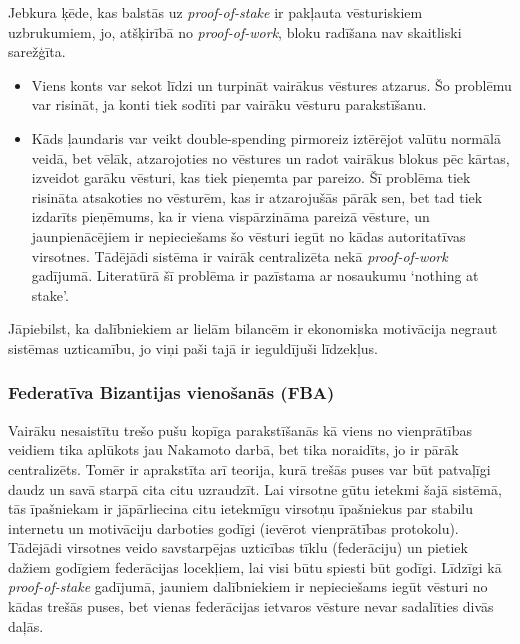 Jebkura ķēde, kas balstās uz \textit{proof-of-stake} ir pakļauta vēsturiskiem uzbrukumiem, jo, atšķirībā no \textit{proof-of-work}, bloku radīšana nav skaitliski sarežģīta.
\begin{itemize}
    \item Viens konts var sekot līdzi un turpināt vairākus vēstures atzarus. Šo problēmu var risināt, ja konti tiek sodīti par vairāku vēsturu parakstīšanu.
    \item Kāds ļaundaris var veikt double-spending pirmoreiz iztērējot valūtu normālā veidā, bet vēlāk, atzarojoties no vēstures un radot vairākus blokus pēc kārtas, izveidot garāku vēsturi, kas tiek pieņemta par pareizo. Šī problēma tiek risināta atsakoties no vēsturēm, kas ir atzarojušās pārāk sen, bet tad tiek izdarīts pieņēmums, ka ir viena vispārzināma pareizā vēsture, un jaunpienācējiem ir nepieciešams šo vēsturi iegūt no kādas autoritatīvas virsotnes. Tādējādi sistēma ir vairāk centralizēta nekā \textit{proof-of-work} gadījumā.\cite{poelstra15} Literatūrā šī problēma ir pazīstama ar nosaukumu `nothing at stake'.
\end{itemize}
Jāpiebilst, ka dalībniekiem ar lielām bilancēm ir ekonomiska motivācija negraut sistēmas uzticamību, jo viņi paši tajā ir ieguldījuši līdzekļus.

\subsubsection{Federatīva Bizantijas vienošanās (FBA)}
Vairāku nesaistītu trešo pušu kopīga parakstīšanās kā viens no vienprātības veidiem tika aplūkots jau Nakamoto darbā\cite{nakamoto08}, bet tika noraidīts, jo ir pārāk centralizēts. Tomēr ir aprakstīta arī teorija, kurā trešās puses var būt patvaļīgi daudz un savā starpā cita citu uzraudzīt.\cite{mazieres15}
Lai virsotne gūtu ietekmi šajā sistēmā, tās īpašniekam ir jāpārliecina citu ietekmīgu virsotņu īpašniekus par stabilu internetu un motivāciju darboties godīgi (ievērot vienprātības protokolu). Tādējādi virsotnes veido savstarpējas uzticības tīklu (federāciju) un pietiek dažiem godīgiem federācijas locekļiem, lai visi būtu spiesti būt godīgi. Līdzīgi kā \textit{proof-of-stake} gadījumā, jauniem dalībniekiem ir nepieciešams iegūt vēsturi no kādas trešās puses, bet vienas federācijas ietvaros vēsture nevar sadalīties divās daļās.

